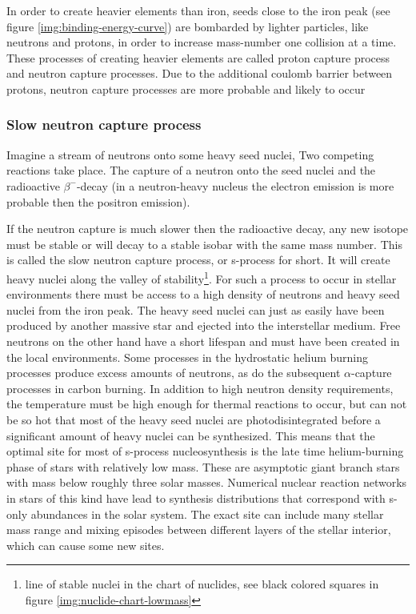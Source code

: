 In order to create heavier elements than iron, seeds close to the iron peak (see figure \ref{img:binding-energy-curve})
are bombarded by lighter particles, like neutrons and protons, in order to increase mass-number one collision at a time.
These processes of creating heavier elements are called proton capture process and neutron capture processes.
Due to the additional coulomb barrier between protons, neutron capture processes are more probable and likely to occur

\subsubsection{Slow neutron capture process} \label{sec:sncp}
Imagine a stream of neutrons onto some heavy seed nuclei, Two competing reactions take place.
The capture of a neutron onto the seed nuclei and the radioactive $\beta^-$-decay
(in a neutron-heavy nucleus the electron emission is more probable then the positron emission).

If the neutron capture is much slower then the radioactive decay, any new
isotope must be stable or will decay to a stable isobar with the same mass number. This is called the slow neutron capture process, or s-process for short.
It will create heavy nuclei along the valley of stability\footnote{line of stable nuclei in the chart of nuclides, see black colored squares in figure \ref{img:nuclide-chart-lowmass}}.
For such a process to occur in stellar environments there must be access to a high density of neutrons and heavy seed nuclei from the iron peak.
The heavy seed nuclei can just as easily have been produced by another massive star and ejected into the interstellar medium. Free neutrons on the other hand have a short lifespan and must have been created in the local environments.
Some processes in the hydrostatic helium burning processes produce excess amounts of neutrons, as do the subsequent $\alpha$-capture processes in carbon burning.
In addition to high neutron density requirements, the temperature must be high enough for thermal reactions to occur, but can not be so hot that most of the heavy seed nuclei are photodisintegrated before a significant amount of heavy nuclei can be synthesized.
This means that the optimal site for most of s-process nucleosynthesis is the late time helium-burning phase of stars with relatively low mass. These are asymptotic giant branch stars with mass below roughly three solar masses.
Numerical nuclear reaction networks in stars of this kind have lead to synthesis distributions that correspond with s-only abundances in the solar system.
The exact site can include many stellar mass range and mixing episodes between different layers of the stellar interior, which can cause some new sites.

